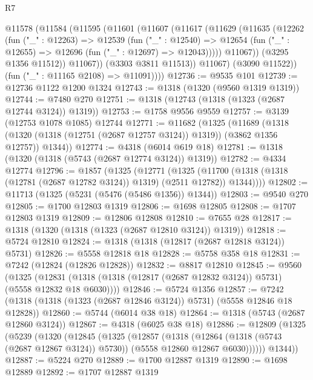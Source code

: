 \begin{lexlean}{R7}
\begin{coremodule}
          @11578
            (@11584
              (@11595
                (@11601
                  (@11607
                    (@11617
                      (@11629
                        (@11635
                          (@12262
                            (fun ("_" : @12263) =>
                            @12539
                              (fun ("_" : @12540) =>
                              @12654
                                (fun ("_" : @12655) => @12696 (fun ("_" : @12697) => @12043)))))
                          @11067))
                      (@3295 @1356 @11512))
                    @11067))
                (@3303 @3811 @11513))
              @11067)
            (@3090 @11522))
          (fun ("_" : @11165 @2108) => @11091))))
@12736 := @9535 @101
@12739 := @12736 @1122 @1200 @1324
@12743 := @1318 (@1320 (@9560 @1319 @1319))
@12744 := @7480 @270
@12751 := @1318 (@12743 (@1318 (@1323 (@2687 @12744 @3124)) @1319))
@12753 := @1758 @9556 @9559
@12757 := @3139 (@12753 @1078 @1085) @12744
@12771 := @11682
    (@1325
      (@11689
        (@1318 (@1320 (@1318 (@12751 (@2687 @12757 @3124)) @1319)) (@3862 @1356 @12757))
        @1344))
@12774 := @4318 (@6014 @619 @18)
@12781 := @1318 (@1320 (@1318 (@5743 (@2687 @12774 @3124)) @1319))
@12782 := @4334 @12774
@12796 := @1857
    (@1325
      (@12771
        (@1325 (@11700 (@1318 (@1318 (@12781 (@2687 @12782 @3124)) @1319) (@2511 @12782)) @1344))))
@12802 := @11713 (@1325 (@5231 (@5476 (@5486 @1356)) @1344))
@12803 := @9540 @270
@12805 := @1700 @12803 @1319
@12806 := @1698 @12805
@12808 := @1707 @12803 @1319
@12809 := @12806 @12808
@12810 := @7655 @28
@12817 := @1318 (@1320 (@1318 (@1323 (@2687 @12810 @3124)) @1319))
@12818 := @5724 @12810
@12824 := @1318 (@1318 (@12817 (@2687 @12818 @3124)) @5731)
@12826 := @5558 @12818 @18
@12828 := @5758 @358 @18
@12831 := @7242 (@12824 (@12826 @12828))
@12832 := @8817 @12810
@12845 := @9560
    (@1325 (@12831 (@1318 (@1318 (@12817 (@2687 @12832 @3124)) @5731) (@5558 @12832 @18 @6030))))
@12846 := @5724 @1356
@12857 := @7242 (@1318 (@1318 (@1323 (@2687 @12846 @3124)) @5731) (@5558 @12846 @18 @12828))
@12860 := @5744 (@6014 @38 @18)
@12864 := @1318 (@5743 (@2687 @12860 @3124))
@12867 := @4318 (@6025 @38 @18)
@12886 := @12809
    (@1325
      (@5239
        (@1320
          (@12845
            (@1325
              (@12857
                (@1318
                  (@12864 (@1318 (@5743 (@2687 @12867 @3124)) @5730))
                  (@5558 @12860 @12867 @6030))))))
        @1344))
@12887 := @5224 @270
@12889 := @1700 @12887 @1319
@12890 := @1698 @12889
@12892 := @1707 @12887 @1319

\end{coremodule}
\end{lexlean}
